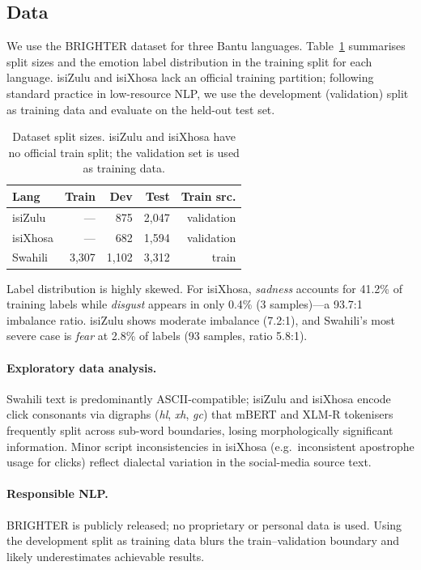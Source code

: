 \documentclass[11pt]{article}
\begin{document}
\subsection{Data}

We use the BRIGHTER dataset for three Bantu languages.
Table~\ref{tab:data} summarises split sizes and the emotion label distribution
in the training split for each language.
isiZulu and isiXhosa lack an official training partition; following standard
practice in low-resource NLP, we use the development (validation) split as
training data and evaluate on the held-out test set.

\begin{table}[h]
\centering
\small
\begin{tabular}{lrrrr}
\toprule
\textbf{Lang} & \textbf{Train} & \textbf{Dev} & \textbf{Test} &
  \textbf{Train src.} \\
\midrule
isiZulu  & ---        & 875    & 2{,}047 & validation \\
isiXhosa & ---        & 682    & 1{,}594 & validation \\
Swahili  & 3{,}307    & 1{,}102 & 3{,}312 & train \\
\bottomrule
\end{tabular}
\caption{Dataset split sizes. isiZulu and isiXhosa have no official train
split; the validation set is used as training data.}
\label{tab:data}
\end{table}

\noindent
Label distribution is highly skewed.
For isiXhosa, \textit{sadness} accounts for 41.2\% of training labels while
\textit{disgust} appears in only 0.4\% (3 samples)---a 93.7:1 imbalance ratio.
isiZulu shows moderate imbalance (7.2:1), and Swahili's most severe case is
\textit{fear} at 2.8\% of labels (93 samples, ratio 5.8:1).

\paragraph{Exploratory data analysis.}
Swahili text is predominantly ASCII-compatible; isiZulu and isiXhosa encode
click consonants via digraphs (\textit{hl}, \textit{xh}, \textit{gc}) that
mBERT and XLM-R tokenisers frequently split across sub-word boundaries, losing
morphologically significant information.
Minor script inconsistencies in isiXhosa (e.g.\ inconsistent apostrophe usage
for clicks) reflect dialectal variation in the social-media source text.

\paragraph{Responsible NLP.}
BRIGHTER is publicly released; no proprietary or personal data is used.
Using the development split as training data blurs the train--validation
boundary and likely underestimates achievable results.
\end{document}
